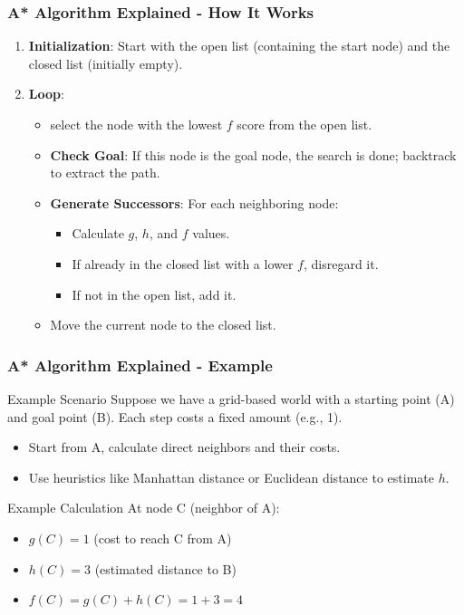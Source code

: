 \documentclass[aspectratio=169]{beamer}
\begin{document}
\begin{frame}[fragile]
    \frametitle{A* Algorithm Explained - How It Works}
    \begin{enumerate}
        \item \textbf{Initialization}: Start with the open list (containing the start node) and the closed list (initially empty).
        \item \textbf{Loop}:
        \begin{itemize}
            \item select the node with the lowest \( f \) score from the open list.
            \item \textbf{Check Goal}: If this node is the goal node, the search is done; backtrack to extract the path.
            \item \textbf{Generate Successors}: For each neighboring node:
            \begin{itemize}
                \item Calculate \( g \), \( h \), and \( f \) values.
                \item If already in the closed list with a lower \( f \), disregard it.
                \item If not in the open list, add it.
            \end{itemize}
            \item Move the current node to the closed list.
        \end{itemize}
    \end{enumerate}
\end{frame}

\begin{frame}[fragile]
    \frametitle{A* Algorithm Explained - Example}
    \begin{block}{Example Scenario}
        Suppose we have a grid-based world with a starting point (A) and goal point (B). Each step costs a fixed amount (e.g., 1). 
    \end{block}
    \begin{itemize}
        \item Start from A, calculate direct neighbors and their costs.
        \item Use heuristics like Manhattan distance or Euclidean distance to estimate \( h \).
    \end{itemize}
    \begin{block}{Example Calculation}
        At node C (neighbor of A):
        \begin{itemize}
            \item \( g(C) = 1 \) (cost to reach C from A)
            \item \( h(C) = 3 \) (estimated distance to B)
            \item \( f(C) = g(C) + h(C) = 1 + 3 = 4 \)
        \end{itemize}
    \end{block}
\end{frame}
\end{document}
